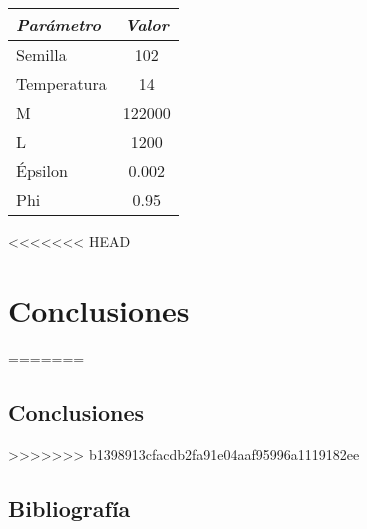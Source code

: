 \documentclass[a4paper]{report}
\begin{document}
\begin{table}[h!]
  \begin{center}
    \begin{tabular}{||l|c||}
      \hline
      \textit{Par\'ametro} & \textit{Valor}\\
      \hline
      Semilla & 102 \\
      Temperatura & 14 \\
      M & 122000 \\
      L & 1200 \\
      \'Epsilon & 0.002 \\
      Phi & 0.95 \\
      \hline
    \end{tabular}
  \end{center}
\end{table}


<<<<<<< HEAD
%   


%   

\chapter{Conclusiones}
=======
\begin{figure}[h!tbp]
  \hspace*{-1.6cm}
  
\end{figure}


\begin{figure}[h!tbp]
  \hspace*{-1.6cm}
  
\end{figure}

\section{Conclusiones}
>>>>>>> b1398913cfacdb2fa91e04aaf95996a1119182ee

\section{Bibliograf\'ia}
\end{document}
